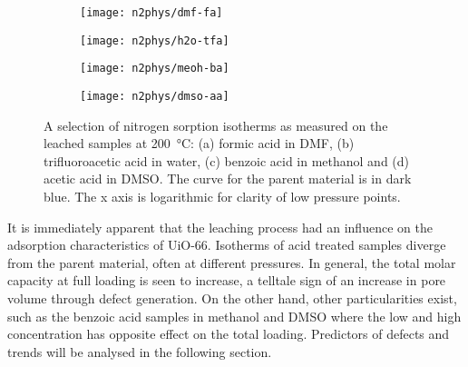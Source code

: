 \begin{figure}[htbp]
	\centering

	\begin{subfigure}{0.5\linewidth}
		\texttt{[image: n2phys/dmf-fa]}%
		\caption{}%
		\label{def:fig:n2phys-dmf-fa}
	\end{subfigure}%
	\begin{subfigure}{0.5\linewidth}
		\texttt{[image: n2phys/h2o-tfa]}%
		\caption{}%
		\label{def:fig:n2phys-h2o-tfa}
	\end{subfigure}%

	\begin{subfigure}{0.5\linewidth}
		\texttt{[image: n2phys/meoh-ba]}%
		\caption{}%
		\label{def:fig:n2phys-meoh-ba}
	\end{subfigure}%
	\begin{subfigure}{0.5\linewidth}
		\texttt{[image: n2phys/dmso-aa]}%
		\caption{}%
		\label{def:fig:n2phys-dmso-aa}
	\end{subfigure}%

	\caption{A selection of nitrogen sorption isotherms as measured on the
		leached samples at \SI{200}{\degreeCelsius}: (a) formic acid in \gls{DMF},
		(b) trifluoroacetic acid in water, (c) benzoic acid
		in methanol and (d) acetic acid
        in \gls{DMSO}. The curve for the parent material is in dark blue.
        The x axis is logarithmic for clarity of low pressure 
        points.}%
	\label{def:fig:n2phys-dataset}
\end{figure}

It is immediately apparent that the leaching process had an influence 
on the adsorption characteristics of UiO-66. Isotherms of acid treated
samples diverge from the parent material, often at different pressures.
In general, the total molar capacity at full loading is seen to increase,
a telltale sign of an increase in pore volume through defect generation.
On the other hand, other particularities exist, such as the benzoic acid
samples in methanol and \gls{DMSO} where the low and high
concentration has opposite effect on the total loading. Predictors 
of defects and trends will be analysed in the following section.